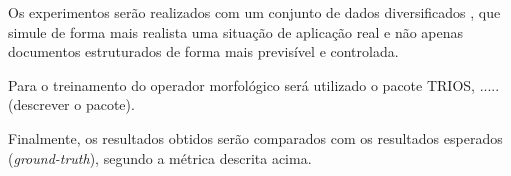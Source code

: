 \documentclass[times, 10pt,twocolumn]{article}
\begin{document}
Os experimentos serão realizados com um conjunto de dados diversificados \cite{Antonacopoulos09arealistic}, 
que simule de forma mais realista uma situação de aplicação real e não apenas documentos estruturados
de forma mais previsível e controlada.

Para o treinamento do operador morfológico será utilizado o pacote
TRIOS, ..... (descrever o pacote). %

Finalmente, os resultados obtidos serão comparados com os resultados
esperados (\emph{ground-truth}), segundo a métrica descrita acima.


{\small 
}
\end{document}

